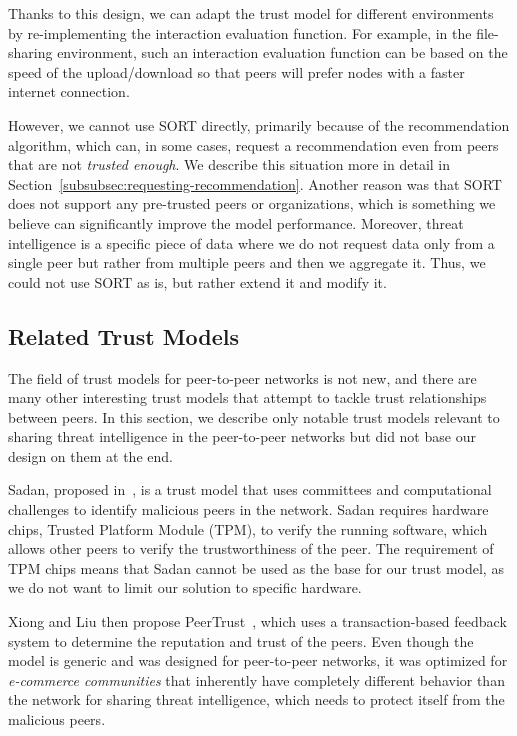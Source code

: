 Thanks to this design, we can adapt the trust model for different environments by re-implementing the interaction evaluation function.
For example, in the file-sharing environment, such an interaction evaluation function can be based on the speed of the upload/download so that peers will prefer nodes with a faster internet connection.

However, we cannot use SORT directly, primarily because of the recommendation algorithm, which can, in some cases, request a recommendation even from peers that are not \textit{trusted enough}. We describe this situation more in detail in Section~\ref{subsubsec:requesting-recommendation}.
Another reason was that SORT does not support any pre-trusted peers or organizations, which is something we believe can significantly improve the model performance.
Moreover, threat intelligence is a specific piece of data where we do not request data only from a single peer but rather from multiple peers and then we aggregate it.
Thus, we could not use SORT as is, but rather extend it and modify it.

\subsection{Related Trust Models}
\label{subsec:related-trust-models}
The field of trust models for peer-to-peer networks is not new, and there are many other interesting trust models that attempt to tackle trust relationships between peers.
In this section, we describe only notable trust models relevant to sharing threat intelligence in the peer-to-peer networks but did not base our design on them at the end.

Sadan, proposed in~\cite{abera2019sadan}, is a trust model that uses committees and computational challenges to identify malicious peers in the network.
Sadan requires hardware chips, Trusted Platform Module (TPM), to verify the running software, which allows other peers to verify the trustworthiness of the peer.
The requirement of TPM chips means that Sadan cannot be used as the base for our trust model, as we do not want to limit our solution to specific hardware.

Xiong and Liu then propose PeerTrust~\cite{xiong2004peertrust}, which uses a transaction-based feedback system to determine the reputation and trust of the peers.
Even though the model is generic and was designed for peer-to-peer networks, it was optimized for \textit{e-commerce communities} that inherently have completely different behavior than the network for sharing threat intelligence, which needs to protect itself from the malicious peers.


